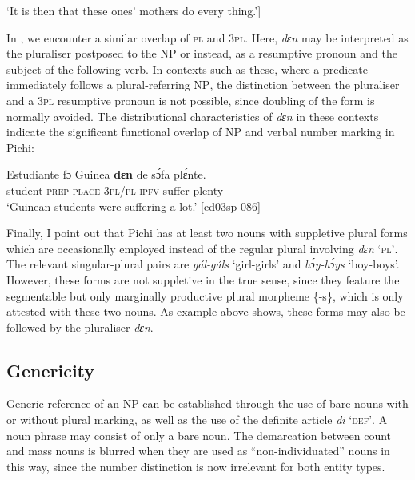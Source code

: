\glt ‘It is then that these ones’ mothers do every thing.’\textstylePichiglossZchn{ [ab03ay 047}]
\z

In , we encounter a similar overlap of \textsc{pl} and \textsc{3pl}. Here, \textit{dɛn} may be interpreted as the pluraliser postposed to the NP or instead, as a resumptive pronoun and the subject of the following verb. In contexts such as these, where a predicate immediately follows a plural-referring \textsc{NP}, the distinction between the pluraliser and a \textsc{3pl} resumptive pronoun is not possible, since doubling of the form is normally avoided. The distributional characteristics of \textit{dɛn} in these contexts indicate the significant functional overlap of \textsc{NP} and verbal number marking in Pichi:


\ea%
    \label{ex:key:221}
    \gll Estudiante  fɔ  Guinea  \textbf{dɛn}    de  sɔ́fa    plɛ́nte.\\
student    \textsc{prep}  \textsc{place}  \textsc{3pl/pl}  \textsc{ipfv}  suffer  plenty\\

\glt ‘Guinean students were suffering a lot.’ [ed03sp 086]
\z

Finally, I point out that Pichi has at least two nouns with suppletive plural forms which are occasionally employed instead of the regular plural involving \textit{dɛn} ‘\textsc{pl’}. The relevant singular-plural pairs are \textit{gál-gáls} ‘girl-girls’ and \textit{bɔ́y-bɔ́ys} ‘boy-boys’. However, these forms are not suppletive in the true sense, since they feature the segmentable but only marginally productive plural morpheme \{-s\}, which is only attested with these two nouns. As example  above shows, these forms may also be followed by the pluraliser \textit{dɛn}. 

\subsection{Genericity}\label{sec:5.1.4}

Generic reference of an NP can be established through the use of bare nouns with or without plural marking, as well as the use of the definite article \textit{di} ‘\textsc{def’}. A noun phrase may consist of only a bare noun. The demarcation between count and mass nouns is blurred when they are used as “non-individuated” \citep{Mufwene1986} nouns in this way, since the number distinction is now irrelevant for both entity types. 


